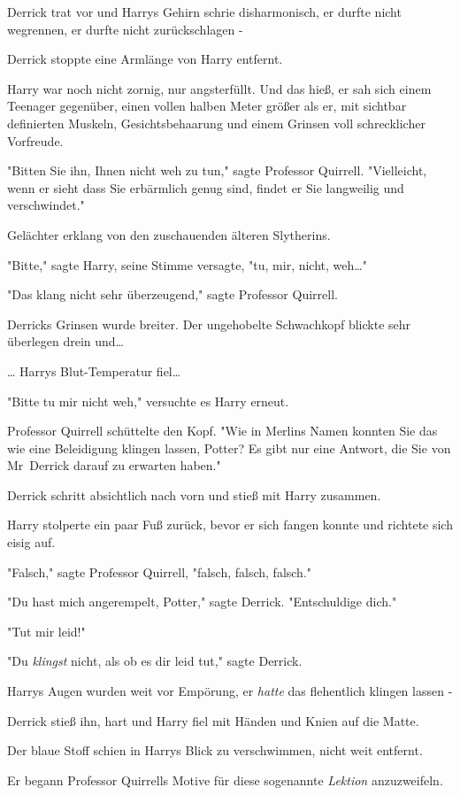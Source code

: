 {Derrick trat vor und Harrys Gehirn schrie disharmonisch, er durfte nicht wegrennen, er durfte nicht zurückschlagen -

Derrick stoppte eine Armlänge von Harry entfernt.

Harry war noch nicht zornig, nur angsterfüllt. Und das hieß, er sah sich einem Teenager gegenüber, einen vollen halben Meter größer als er, mit sichtbar definierten Muskeln, Gesichtsbehaarung und einem Grinsen voll schrecklicher Vorfreude.

"Bitten Sie ihn, Ihnen nicht weh zu tun," sagte Professor Quirrell. "Vielleicht, wenn er sieht dass Sie erbärmlich genug sind, findet er Sie langweilig und verschwindet."

Gelächter erklang von den zuschauenden älteren Slytherins.

"Bitte," sagte Harry, seine Stimme versagte, "tu, mir, nicht, weh…"

"Das klang nicht sehr überzeugend," sagte Professor Quirrell.

Derricks Grinsen wurde breiter. Der ungehobelte Schwachkopf blickte sehr überlegen drein und…

… Harrys Blut-Temperatur fiel…

"Bitte tu mir nicht weh," versuchte es Harry erneut.

Professor Quirrell schüttelte den Kopf. "Wie in Merlins Namen konnten Sie das wie eine Beleidigung klingen lassen, Potter? Es gibt nur eine Antwort, die Sie von Mr~Derrick darauf zu erwarten haben."

Derrick schritt absichtlich nach vorn und stieß mit Harry zusammen.

Harry stolperte ein paar Fuß zurück, bevor er sich fangen konnte und richtete sich eisig auf.

"Falsch," sagte Professor Quirrell, "falsch, falsch, falsch."

"Du hast mich angerempelt, Potter," sagte Derrick. "Entschuldige dich."

"Tut mir leid!"

"Du \emph{klingst} nicht, als ob es dir leid tut," sagte Derrick.

Harrys Augen wurden weit vor Empörung, er \emph{hatte} das flehentlich klingen lassen -

Derrick stieß ihn, hart und Harry fiel mit Händen und Knien auf die Matte.

Der blaue Stoff schien in Harrys Blick zu verschwimmen, nicht weit entfernt.

Er begann Professor Quirrells Motive für diese sogenannte \emph{Lektion} anzuzweifeln.

}
